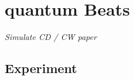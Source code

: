 \renewcommand{\lastmod}{March 26, 2020}


\chapter{quantum Beats}


\textit{Simulate CD / CW paper}




\section{Experiment}







\printbibliography[segment=\therefsegment,heading=subbibliography]
